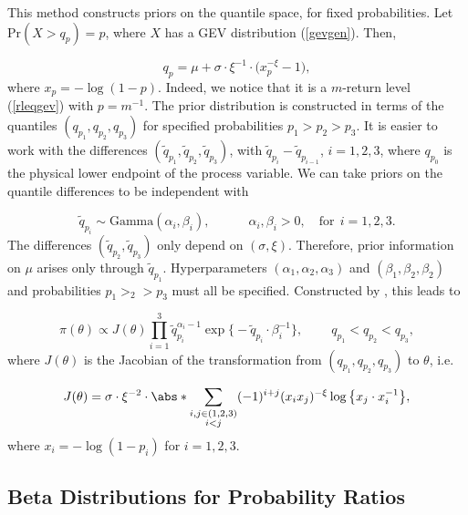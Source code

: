 This method constructs priors on the quantile space, for fixed probabilities. Let $\text{Pr}(X>q_p)=p$, where $X$ has a GEV distribution (\ref{gevgen}). Then,

\begin{equation*}
q_p=\mu + \sigma\cdot\xi^{-1}\cdot\big(x_p^{-\xi}-1\big),
\end{equation*}
where $x_p=-\log (1-p)$. Indeed, we notice that it is a $m$-return level (\ref{rleqgev}) with $p=m^{-1}$. The prior distribution is constructed in terms of the quantiles $(q_{p_1},q_{p_2}, q_{p_3})$ for specified probabilities $p_1>p_2>p_3$. It is easier to work with the differences $(\tilde{q}_{p_1},\tilde{q}_{p_2}, \tilde{q}_{p_3})$, with $\tilde{q}_{p_i}-\tilde{q}_{p_{i-1}}$, $i=1,2,3$, where $q_{p_0}$ is the physical lower endpoint of the process variable. We can take priors on the quantile differences to be independent with 

\begin{equation*}
\tilde{q}_{p_i}\sim \text{Gamma}(\alpha_i,\beta_i), \qquad\quad \alpha_i,\beta_i>0, \quad \text{for} \ \  i=1,2,3.
\end{equation*}
The differences $(\tilde{q}_{p_2},\tilde{q}_{p_3})$ only depend on $(\sigma,\xi)$. Therefore, prior information on $\mu$ arises only through $\tilde{q}_{p_1}$. Hyperparameters $(\alpha_1,\alpha_2,\alpha_3)$ and $(\beta_1,\beta_2,\beta_2)$ and probabilities $p_1>_2>p_3$ must all be specified. Constructed by \citet{coles_tawn_1996}, this leads to 

\begin{equation}
\pi(\theta)\propto J(\theta)\prod_{i=1}^3 \tilde{q}_{p_i}^{\alpha_i-1}\exp\big\{-\tilde{q}_{p_i}\cdot \beta_i^{-1}\big\}, \qquad \ q_{p_1}<q_{p_2}<q_{p_3},
\end{equation}
where $J(\theta)$ is the Jacobian of the transformation from $(q_{p_1},q_{p_2},q_{p_3})$ to $\theta$, i.e.

\begin{equation}
J(\theta)=\sigma\cdot\xi^{-2}\cdot\abs*{\sum_{\substack{i,j\in(1,2,3) \\ i<j}} (-1)^{i+j} (x_ix_j)^{-\xi} \log\big\{x_j\cdot x_i^{-1}\big\}},
\end{equation}
where $x_i=-\log(1-p_i)$ for $i=1,2,3$.

\subsection{Beta Distributions for Probability Ratios}

